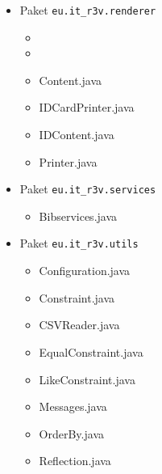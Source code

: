 \documentclass[fontsize=12pt,paper=a4,twoside]{scrartcl}
\begin{document}
\begin{itemize}
\item{Paket \texttt{eu.it\_r3v.renderer}}

\begin{itemize}
\item{}
\item{}
\item{Content.java}
\item{IDCardPrinter.java}
\item{IDContent.java}
\item{Printer.java}
\end{itemize}

\item{Paket \texttt{eu.it\_r3v.services}}

\begin{itemize}
\item{Bibservices.java}
\end{itemize}

\item{Paket \texttt{eu.it\_r3v.utils}}

\begin{itemize}
\item{Configuration.java}
\item{Constraint.java}
\item{CSVReader.java}
\item{EqualConstraint.java}
\item{LikeConstraint.java}
\item{Messages.java}
\item{OrderBy.java}
\item{Reflection.java}
\end{itemize}

\end{itemize}
\end{document}
